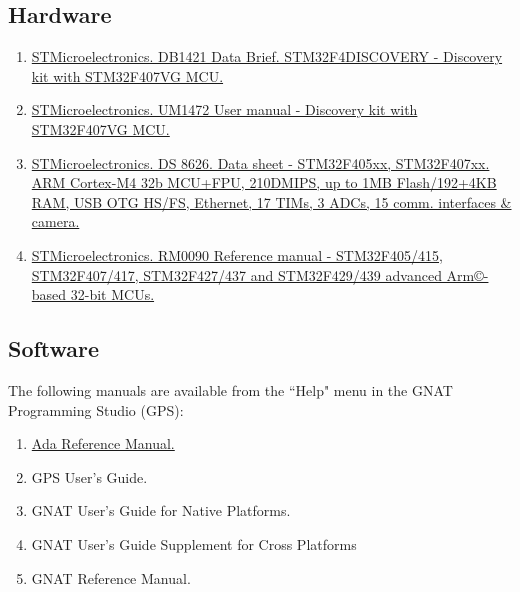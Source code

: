 \subsection*{Hardware}
\begin{enumerate}
\item	\href{https://www.st.com/resource/en/data\_brief/stm32f4discovery.pdf}{STMicroelectronics. DB1421 Data Brief.  STM32F4DISCOVERY - Discovery kit with STM32F407VG MCU.}
\item \href{https://www.st.com/content/ccc/resource/technical/document/user\_manual/70/fe/4a/3f/e7/e1/4f/7d/DM00039084.pdf/files/DM00039084.pdf/jcr:content/translations/en.DM00039084.pdf}{STMicroelectronics. UM1472 User manual - Discovery kit with STM32F407VG MCU.}
\item \href{https://www.st.com/resource/en/datasheet/dm00037051.pdf}{STMicroelectronics. DS 8626. Data sheet - STM32F405xx, STM32F407xx. ARM Cortex-M4 32b MCU+FPU, 210DMIPS, up to 1MB Flash/192+4KB RAM, USB OTG HS/FS, Ethernet, 17 TIMs, 3 ADCs, 15 comm. interfaces \& camera.}
\item \href{https://www.st.com/content/ccc/resource/technical/document/reference\_manual/3d/6d/5a/66/b4/99/40/d4/DM00031020.pdf/files/DM00031020.pdf/jcr:content/translations/en.DM00031020.pdf}{STMicroelectronics. RM0090 Reference manual - STM32F405/415, STM32F407/417, STM32F427/437 and STM32F429/439 advanced Arm\copyright-based 32-bit MCUs.}
\end{enumerate}

\subsection*{Software}

The following manuals are available from the ``Help" menu in the GNAT Programming Studio (GPS):
\begin{enumerate}
\item \href{http://www.ada-auth.org/standards/rm12i\_w\_tc1/html/RM-TTL.html}{Ada Reference Manual.}
\item	GPS User's Guide.
\item	GNAT User's Guide for Native Platforms.
\item	GNAT User's Guide Supplement for Cross Platforms
\item	GNAT Reference Manual.
\end{enumerate}


